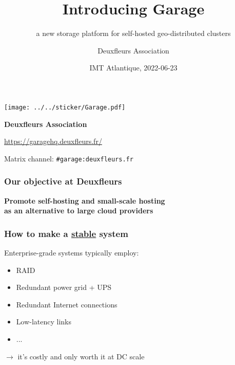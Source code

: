 \documentclass[aspectratio=169]{beamer}
\title{Introducing Garage}
\subtitle{a new storage platform for self-hosted geo-distributed clusters}
\author{Deuxfleurs Association}
\date{IMT Atlantique, 2022-06-23}
\begin{document}
\begin{frame}
	\centering
	\texttt{[image: ../../sticker/Garage.pdf]}
	\vspace{1em}

	{\large\bf Deuxfleurs Association}
	\vspace{1em}

	\url{https://garagehq.deuxfleurs.fr/}

	Matrix channel: \texttt{\#garage:deuxfleurs.fr}
\end{frame}

\begin{frame}
	\frametitle{Our objective at Deuxfleurs}
	
	\begin{center}
		\textbf{Promote self-hosting and small-scale hosting\\
			as an alternative to large cloud providers}
	\end{center}
	\vspace{2em}
\end{frame}

\begin{frame}
	\frametitle{How to make a \underline{stable} system}

	Enterprise-grade systems typically employ:
	\vspace{1em}
	\begin{itemize}
		\item RAID
		\item Redundant power grid + UPS
		\item Redundant Internet connections
		\item Low-latency links
		\item ... 
	\end{itemize}
	\vspace{1em}
	$\to$ it's costly and only worth it at DC scale
\end{frame}
\end{document}

